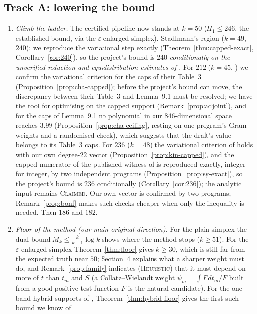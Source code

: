 \documentclass[11pt]{amsart}
\theoremstyle{definition}
\theoremstyle{remark}
\newcommand{\lbl}[1]{\textup{\textsc{#1}}}
\begin{document}
\subsection*{Track A: lowering the bound}
\begin{enumerate}
\item \emph{Climb the ladder.} The certified pipeline now stands at $k=50$
($H_1\le246$, the established bound, via the $\varepsilon$-enlarged simplex).
Stadlmann's region ($k=49$, $240$): we reproduce the variational
step exactly (Theorem~\ref{thm:capped-exact}, Corollary~\ref{cor:240}), so the
project's bound is $240$ \emph{conditionally on the unverified reduction
\cite[Prop.~1]{Sta26} and equidistribution estimates of \cite{Sta26}}. For $212$ ($k=45$,
\cite{Cha26}) we confirm the variational criterion for the caps of
their Table~3 (Proposition~\ref{prop:cha-capped}); before the project's bound
can move, the discrepancy between their Table~3 and Lemma~9.1 must be
resolved; we have the tool for optimising on the capped support
(Remark~\ref{prop:adjoint}), and for the caps of Lemma~9.1 no polynomial in
our $846$-dimensional space reaches $3.99$ (Proposition~\ref{prop:cha-ceiling},
resting on one program's Gram weights and a randomised check), which suggests
that the draft's value belongs to its Table~3 caps. For $236$ ($k=48$) the variational criterion of \cite{Kin26} holds with
our own degree-$22$ vector (Proposition~\ref{prop:kin-capped}), and the
capped numerator of the published witness of \cite{SY26} is reproduced
exactly, integer for integer, by two independent programs
(Proposition~\ref{prop:sy-exact}), so the project's bound is $236$
conditionally (Corollary~\ref{cor:236}); the analytic input remains
\lbl{Claimed}. Our own vector is confirmed by
two programs; Remark~\ref{prop:bonf} makes such checks cheaper
when only the inequality is needed. Then
$186$ and $182$.
\item \emph{Floor of the method (our main original direction).} For the plain
simplex the dual bound $M_k\le\frac{k}{k-1}\log k$ shows where the method
stops ($k\ge51$). For the $\varepsilon$-enlarged simplex
Theorem~\ref{thm:floor} gives $k\ge30$, which is still far from the expected
truth near $50$; Section~4 explains what a sharper weight must do, and
Remark~\ref{prop:family} indicates (\lbl{Heuristic}) that it must
depend on more of $t$ than $t_m$ and $S$ (a Collatz--Wielandt weight $\psi_m=\int F\,dt_m/F$ built
from a good positive test function $F$ is the natural candidate). For the
one-band hybrid supports of \cite{Sta26,Cha26},
Theorem~\ref{thm:hybrid-floor} gives the first such bound we know of

\end{enumerate}
\end{document}
